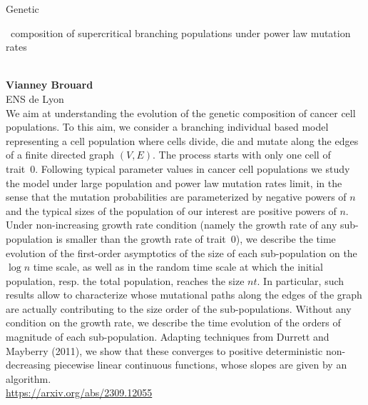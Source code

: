 \documentclass[12pt,a4paper]{article}
\newcommand{\ZAbst}{\rule[-1ex]{0pt}{2ex}\ } %
\begin{document}
\noindent
{\Large Genetic\ZAbst composition of supercritical branching populations under power law mutation rates}\\[1ex]
{\large\textbf{ Vianney  Brouard}\\[1ex] ENS de Lyon}\\[2ex]
We aim at understanding the evolution of the genetic composition of cancer cell populations. To this aim, we consider a branching individual based model representing a cell population where cells divide, die and mutate along the edges of a finite directed graph $(V,E)$. The process starts with only one cell of trait~0. Following typical parameter values in cancer cell populations we study the model under large population and power law mutation rates limit, in the sense that the mutation probabilities are parameterized by negative powers of $n$ and the typical sizes of the population of our interest are positive powers of $n$. Under non-increasing growth rate condition (namely the growth rate of any sub-population is smaller than the growth rate of trait~0), we describe the time evolution of the first-order asymptotics of the size of each sub-population on the $\log n$ time scale, as well as in the random time scale at which the initial population, resp. the total population, reaches the size $nt$. In particular, such results allow to characterize whose mutational paths along the edges of the graph are actually contributing to the size order of the sub-populations. Without any condition on the growth rate, we describe the time evolution of the orders of magnitude of each sub-population. Adapting techniques from Durrett and Mayberry (2011), we show that these converges to positive deterministic non-decreasing piecewise linear continuous functions, whose slopes are given by an algorithm. \\
\url{https://arxiv.org/abs/2309.12055}


\bigskip \bigskip  %
\end{document}
